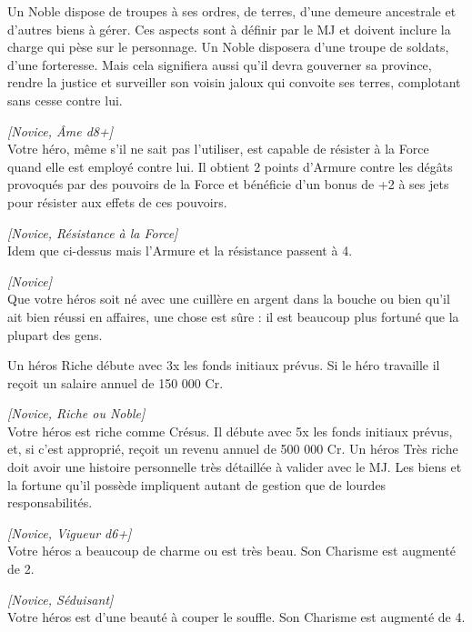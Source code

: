 \begin{description}[align=left]
        Un Noble dispose de troupes à ses ordres, de terres, d’une demeure ancestrale et d’autres biens à gérer. Ces aspects sont à définir par le MJ et doivent inclure la charge qui pèse sur le personnage. Un Noble disposera d’une troupe de soldats, d’une forteresse. Mais cela signifiera aussi qu’il devra gouverner sa province, rendre la justice et surveiller son voisin jaloux qui convoite ses terres, complotant sans cesse contre lui.

    \item [Résistance à la Force]
    	\emph{[Novice, \^Ame d8+]}\\
        Votre héro, même s’il ne sait pas l’utiliser, est capable de résister à la Force quand elle est employé contre lui. Il obtient 2 points d’Armure contre les dégâts provoqués par des pouvoirs de la Force et bénéficie d’un bonus de +2 à ses jets pour résister aux effets de ces pouvoirs.

    \item [Grande résistance à la Force]
    	\emph{[Novice, Résistance à la Force]}\\
        Idem que ci-dessus mais l’Armure et la résistance passent à 4.

    \item [Riche]
    	\emph{[Novice]}\\
        Que votre héros soit né avec une cuillère en argent dans la bouche ou bien qu’il ait bien réussi en affaires, une chose est sûre : il est beaucoup plus fortuné que la plupart des gens.

		Un héros Riche débute avec 3x les fonds initiaux prévus. Si le héro travaille il reçoit un salaire annuel de 150 000 Cr.

    \item [Très riche]
    	\emph{[Novice, Riche ou Noble]}\\
        Votre héros est riche comme Crésus. Il débute avec 5x les fonds initiaux prévus, et, si c’est approprié, reçoit un revenu annuel de 500 000 Cr. Un héros Très riche doit avoir une histoire personnelle très détaillée à valider avec le MJ. Les biens et la fortune qu’il possède impliquent autant de gestion que de lourdes responsabilités.

    \item [Séduisant]
    	\emph{[Novice, Vigueur d6+]}\\
        Votre héros a beaucoup de charme ou est très beau. Son Charisme est augmenté de 2.

    \item [Très séduisant]
    	\emph{[Novice, Séduisant]}\\
        Votre héros est d’une beauté à couper le souffle. Son Charisme est augmenté de 4.


\end{description}
